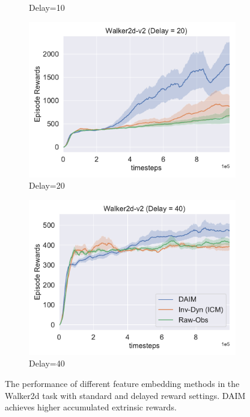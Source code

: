 \begin{figure}[h!]
\begin{subfigure}[t]{0.49\textwidth}
    \caption{Delay=10}
  \end{subfigure}\hfill
  \begin{subfigure}[t]{0.49\textwidth}
    \includegraphics[width=\textwidth]{figures/chapter5/embedding/delay20.pdf}
    \caption{Delay=20}
  \end{subfigure}\hfill
  \begin{subfigure}[t]{0.49\textwidth}
    \includegraphics[width=\textwidth]{figures/chapter5/embedding/delay40.pdf}
    \caption{Delay=40}
  \end{subfigure}\hfill
  \caption[Results of different feature embedding methods in the Walker2d task with standard and delayed reward settings.]{The performance of different feature embedding methods in the Walker2d task with standard and delayed reward settings. DAIM achieves higher accumulated extrinsic rewards.} 
  \label{fig:walker2d_results}
\end{figure}
